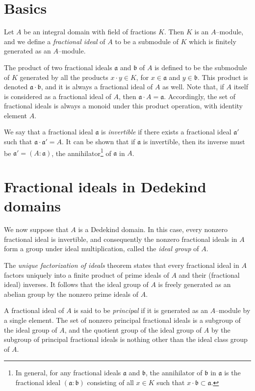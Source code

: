 \documentclass[12pt]{article}
\renewcommand{\a}{{\mathfrak{a}}}
\renewcommand{\b}{{\mathfrak{b}}}
\begin{document}
\section{Basics}

Let $A$ be an integral domain with field of fractions $K$. Then $K$ is
an $A$--module, and we define a {\em fractional ideal} of $A$ to be a
submodule of $K$ which is finitely generated as an $A$--module.

The product of two fractional ideals $\a$ and $\b$ of $A$ is defined
to be the submodule of $K$ generated by all the products $x \cdot y
\in K$, for $x \in \a$ and $y \in \b$. This product is denoted $\a
\cdot \b$, and it is always a fractional ideal of $A$ as well. Note
that, if $A$ itself is considered as a fractional ideal of $A$, then
$\a \cdot A = \a$. Accordingly, the set of fractional ideals is always
a monoid under this product operation, with identity element $A$.

We say that a fractional ideal $\a$ is {\em invertible} if there
exists a fractional ideal $\a'$ such that $\a \cdot \a' = A$. It can
be shown that if $\a$ is invertible, then its inverse must be $\a' =
(A:\a)$, the annihilator\footnote{In general, for any fractional
ideals $\a$ and $\b$, the annihilator of $\b$ in $\a$ is the
fractional ideal $(\a:\b)$ consisting of all $x \in K$ such that
$x\cdot\b \subset \a$.} of $\a$ in $A$.

\section{Fractional ideals in Dedekind domains}

We now suppose that $A$ is a Dedekind domain. In this case, every
nonzero fractional ideal is invertible, and consequently the nonzero
fractional ideals in $A$ form a group under ideal multiplication,
called the {\em ideal group} of $A$.

The {\em unique factorization of ideals} theorem states that every
fractional ideal in $A$ factors uniquely into a finite product of
prime ideals of $A$ and their (fractional ideal) inverses. It follows
that the ideal group of $A$ is freely generated as an abelian group by
the nonzero prime ideals of $A$.

A fractional ideal of $A$ is said to be {\em principal} if it is
generated as an $A$--module by a single element. The set of nonzero
principal fractional ideals is a subgroup of the ideal group of $A$,
and the quotient group of the ideal group of $A$ by the subgroup of
principal fractional ideals is nothing other than the ideal class
group of $A$.
\end{document}
